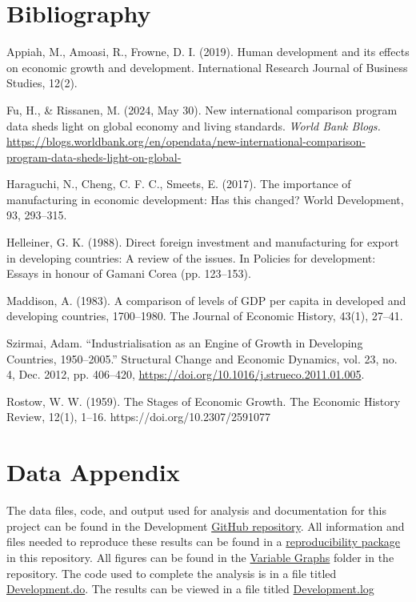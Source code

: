 \documentclass[12pt]{article}
\begin{document}
\newpage
\section*{Bibliography}
\singlespacing
\setlength\bibsep{0pt}

Appiah, M., Amoasi, R., Frowne, D. I. (2019). Human development and its effects on economic growth and development. International Research Journal of Business Studies, 12(2).

Fu, H., \& Rissanen, M. (2024, May 30). New international comparison program data sheds light on global economy and living standards. \textit{World Bank Blogs.} \href{https://blogs.worldbank.org/en/opendata/new-international-comparison-program-data-sheds-light-on-global-}{https://blogs.worldbank.org/en/opendata/new-international-comparison-program-data-sheds-light-on-global-}

Haraguchi, N., Cheng, C. F. C., Smeets, E. (2017). The importance of manufacturing in economic development: Has this changed? World Development, 93, 293–315.

Helleiner, G. K. (1988). Direct foreign investment and manufacturing for export in developing countries: A review of the issues. In Policies for development: Essays in honour of Gamani Corea (pp. 123–153).

Maddison, A. (1983). A comparison of levels of GDP per capita in developed and developing countries, 1700–1980. The Journal of Economic History, 43(1), 27–41.

Szirmai, Adam. “Industrialisation as an Engine of Growth in Developing Countries, 1950–2005.” Structural Change and Economic Dynamics, vol. 23, no. 4, Dec. 2012, pp. 406–420, \href{https://doi.org/10.1016/j.strueco.2011.01.005}{https://doi.org/10.1016/j.strueco.2011.01.005}.

Rostow, W. W. (1959). The Stages of Economic Growth. The Economic History Review, 12(1), 1–16. https://doi.org/10.2307/2591077


\newpage
\section*{Data Appendix} \label{sec:appendixa}

The data files, code, and output used for analysis and documentation for this project can be found in the Development \href{https://github.com/ecn310/course-project-developmentv}{GitHub repository}. All information and files needed to reproduce these results can be found in a \href{https://github.com/ecn310/course-project-development/tree/main/Reproducibility%20Package}{reproducibility package} in this repository. All figures can be found in the \href{https://github.com/ecn310/course-project-development/tree/main/Variable%20Graphs}{Variable Graphs} folder in the repository. The code used to complete the analysis is in a file titled \href{https://github.com/ecn310/course-project-development/tree/main/Reproducibility%20Package}{Development.do}. 
The results can be viewed in a file titled \href{https://github.com/ecn310/course-project-development/blob/main/Merge_GDP_Mftc.log}{Development.log} 
 
\end{document}
